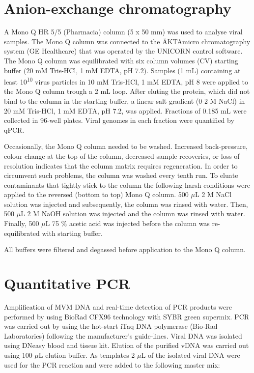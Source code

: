 \section{Anion-exchange chromatography}
A Mono Q HR 5/5 (Pharmacia) column (5 x 50 mm) was used to analyse viral samples. The Mono Q column was connected to the ÄKTAmicro chromatography system (GE Healthcare) that was operated by the UNICORN control software. The Mono Q column was equilibrated with six column volumes (CV) starting buffer (20 mM Tris-HCl, 1 mM EDTA, pH 7.2). Samples (1 mL) containing at least 10\textsuperscript{10} virus particles in 10 mM Tris-HCl, 1 mM EDTA, pH 8 were applied to the Mono Q column trough a 2 mL loop. After eluting the protein, which did not bind to the column in the starting buffer, a linear salt gradient (0-2 M NaCl) in 20 mM Tris-HCl, 1 mM EDTA, pH 7.2, was applied. Fractions of 0.185 mL were collected in 96-well plates. Viral genomes in each fraction were quantified by qPCR.  

Occasionally, the Mono Q column needed to be washed. Increased back-pressure, colour change at the top of the column, decreased sample recoveries, or loss of resolution indicates that the column matrix requires regeneration. In order to circumvent such problems, the column was washed every tenth run. To eluate contaminants that tightly stick to the column the following harsh conditions were applied to the reversed (bottom to top) Mono Q column. 500 $\mu$L 2 M NaCl solution was injected and subsequently, the column was rinsed with water. Then, 500 $\mu$L 2 M NaOH solution was injected and the column was rinsed with water. Finally, 500 $\mu$L 75 \% acetic acid was injected before the column was re-equilibrated with starting buffer.             

All buffers were filtered and degassed before application to the Mono Q column.



\section{Quantitative PCR}
Amplification of MVM DNA and real-time detection of PCR products were performed by using BioRad CFX96 technology with SYBR green supermix. PCR was carried out by using the hot-start iTaq\textsuperscript{\texttrademark} DNA polymerase (Bio-Rad Laboratories) following the manufacturer’s guide-lines. Viral DNA was isolated using DNeasy blood and tissue kit. Elution of the purified vDNA was carried out using 100 $\mu$L elution buffer. As templates 2 $\mu$L of the isolated viral DNA were used for the PCR reaction and were added to the following master mix:\\

